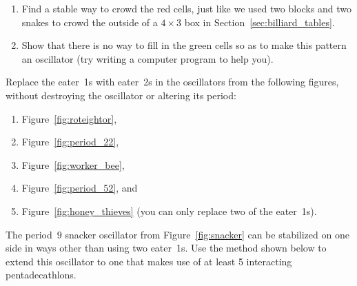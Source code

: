 \begin{multicols}{2}
\begin{problem}
		\begin{center}
		\end{center}
		
		\begin{enumerate}[label=\bf\color{ocre}(\alph*)]
			\item Find a stable way to crowd the red cells, just like we used two blocks and two snakes to crowd the outside of a $4 \times 3$ box in Section~\ref{sec:billiard_tables}.
			
			\item Show that there is no way to fill in the green cells so as to make this pattern an oscillator (try writing a computer program to help you).
		\end{enumerate}
	\end{problem}
	
	
	\mfilbreak
	
	
	\begin{problem}\label{exer:eater_1_replace_eater_2_osc} 
		Replace the eater~1s with eater~2s in the oscillators from the following figures, without destroying the oscillator or altering its period:\smallskip
		
		\begin{enumerate}[label=\bf\color{ocre}(\alph*)]
			\item Figure~\ref{fig:roteightor},
			
			\item Figure~\ref{fig:period_22},
			
			\item Figure~\ref{fig:worker_bee},
			
			\item Figure~\ref{fig:period_52}, and
			
			\item Figure~\ref{fig:honey_thieves} (you can only replace two of the eater~1s). 
		\end{enumerate}
	\end{problem}
	
	
	\mfilbreak
	
	
	\begin{problem}\label{exer:extend_snacker} 
		The period~$9$ snacker oscillator from Figure~\ref{fig:snacker} can be stabilized on one side in ways other than using two eater~1s. Use the method shown below to extend this oscillator to one that makes use of at least 5 interacting pentadecathlons.
		
		\begin{center}
		\end{center}
	\end{problem}
	

\end{multicols}
